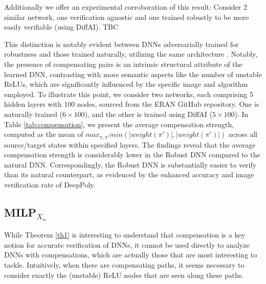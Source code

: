 
Additionally we offer an experimental corroboration of this result:
Consider 2 similar network, one verification agnostic and one trained robustly to be more easily verifiable (using DiffAI). TBC

This distinction is notably evident between DNNs adversarially trained for robustness and those trained naturally, utilizing the same architecture \cite{deeppoly,prima,crown}. Notably, the presence of compensating pairs is an intrinsic structural attribute of the learned DNN, contrasting with more semantic aspects like the number of unstable ReLUs, which are significantly influenced by the specific image and algorithm employed. To illustrate this point, we consider two networks, each comprising 5 hidden layers with 100 nodes, sourced from the ERAN GitHub repository. One is naturally trained ($6\times100$), and the other is trained using DiffAI ($5\times100$). In Table \ref{tab:compensation}, we present the average compensation strength, computed as the mean of $max_{\pi,\pi'} min(|weight(\pi')|,|weight(\pi')|)$ across all source/target states within specified layers. The findings reveal that the average compensation strength is considerably lower in the Robust DNN compared to the natural DNN. Correspondingly, the Robust DNN is substantially easier to verify than its natural counterpart, as evidenced by the enhanced accuracy and image verification rate of DeepPoly.


\subsection{MILP$_{X_n}$}



While Theorem \ref{th1} is interesting to understand that compensation is a key notion for accurate verification of DNNs, it cannot be used directly to analyze DNNs with compensations, which are actually those that are most interesting to tackle.
Intuitively, when there are compensating paths, it seems necessary to consider exactly the (unstable) ReLU nodes that are seen along these paths. 

